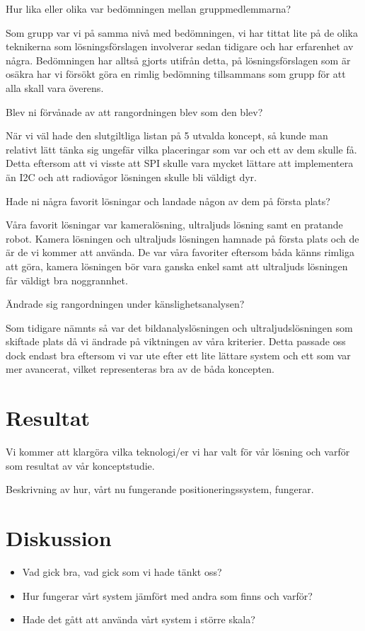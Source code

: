 \documentclass[11pt, a4paper]{report}
\begin{document}
Hur lika eller olika var bedömningen mellan gruppmedlemmarna?

Som grupp var vi på samma nivå med bedömningen, vi har tittat lite på de olika teknikerna som lösningsförslagen involverar sedan tidigare och har erfarenhet av några. Bedömningen har alltså gjorts utifrån detta, på lösningsförslagen som är osäkra har vi försökt göra en rimlig bedömning tillsammans som grupp för att alla skall vara överens.

Blev ni förvånade av att rangordningen blev som den blev?

När vi väl hade den slutgiltliga listan på 5 utvalda koncept, så kunde man relativt lätt tänka sig ungefär vilka placeringar som var och ett av dem skulle få. Detta eftersom att vi visste att SPI skulle vara mycket lättare att implementera än I2C och att radiovågor lösningen skulle bli väldigt dyr.

Hade ni några favorit lösningar och landade någon av dem på första plats?

Våra favorit lösningar var kameralösning, ultraljuds lösning samt en pratande robot. Kamera lösningen och ultraljuds lösningen hamnade på första plats och de är de vi kommer att använda. De var våra favoriter eftersom båda känns rimliga att göra, kamera lösningen bör vara ganska enkel samt att ultraljuds lösningen får väldigt bra noggrannhet.

Ändrade sig rangordningen under känslighetsanalysen?

Som tidigare nämnts så var det bildanalyslösningen och ultraljudslösningen som skiftade plats då vi ändrade på viktningen av våra kriterier. Detta passade oss dock endast bra eftersom vi var ute efter ett lite lättare system och ett som var mer avancerat, vilket representeras bra av de båda koncepten. 


\chapter{Resultat}
Vi kommer att klargöra vilka teknologi/er vi har valt för vår lösning och varför som resultat av vår konceptstudie.

Beskrivning av hur, vårt nu fungerande positioneringssystem, fungerar. 

\chapter{Diskussion}
\begin{itemize}
\item Vad gick bra, vad gick som vi hade tänkt oss?
\item Hur fungerar vårt system jämfört med andra som finns och varför?
\item Hade det gått att använda vårt system i större skala?
\end{itemize} 
\end{document}
